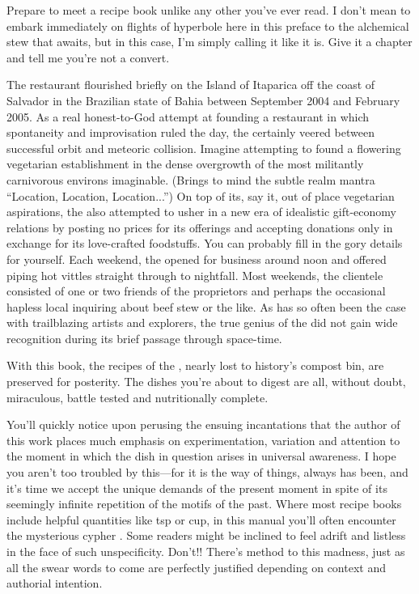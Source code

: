 
Prepare to meet a recipe book unlike any other you've ever read.  I
don't mean to embark immediately on flights of hyperbole here in this
preface to the alchemical stew that awaits, but in this case, I'm
simply calling it like it is.  Give it a chapter and tell me you're
not a convert.

The  restaurant flourished briefly on the Island of Itaparica
off the coast of Salvador in the Brazilian state of Bahia between
September 2004 and February 2005.  As a real honest-to-God attempt at
founding a restaurant in which spontaneity and improvisation ruled the
day, the  certainly veered between successful orbit and meteoric
collision.  Imagine attempting to found a flowering vegetarian
establishment in the dense overgrowth of the most militantly
carnivorous environs imaginable. (Brings to mind the subtle realm
mantra ``Location, Location, Location...'') On top of its, say it, out
of place vegetarian aspirations, the  also attempted to usher in
a new era of idealistic gift-economy relations by posting no prices
for its offerings and accepting donations only in exchange for its
love-crafted foodstuffs.  You can probably fill in the gory details
for yourself.  Each weekend, the  opened for business around
noon and offered piping hot vittles straight through to nightfall.
Most weekends, the clientele consisted of one or two friends of the
proprietors and perhaps the occasional hapless local inquiring about
beef stew or the like.  As has so often been the case with
trailblazing artists and explorers, the true genius of the  did
not gain wide recognition during its brief passage through space-time.

With this book, the recipes of the , nearly lost to history's
compost bin, are preserved for posterity.  The dishes you're about to
digest are all, without doubt, miraculous, battle tested and
nutritionally complete.

You'll quickly notice upon perusing the ensuing incantations that the
author of this work places much emphasis on experimentation, variation
and attention to the moment in which the dish in question arises in
universal awareness.  I hope you aren't too troubled by this---for it
is the way of things, always has been, and it's time we accept the
unique demands of the present moment in spite of its seemingly
infinite repetition of the motifs of the past.  Where most recipe
books include helpful quantities like \onequarter tsp or \onehalf cup, in
this manual you'll often encounter the mysterious cypher .  Some
readers might be inclined to feel adrift and listless in the face of
such unspecificity.  Don't!!  There's method to this madness, just as
all the swear words to come are perfectly justified depending on
context and authorial intention.

